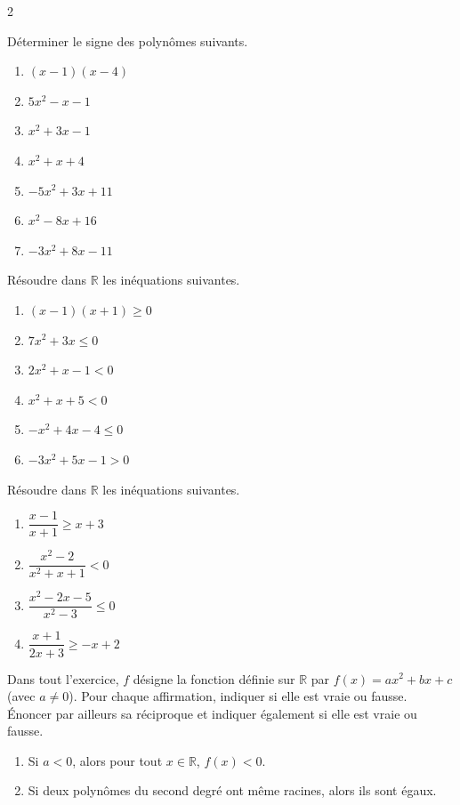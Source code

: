 \documentclass[a4paper,12pt]{article}
\begin{document}
\begin{multicols}{2}
\begin{exercice}[title=Exercice 13 \quad$\star\star$\quad\  {[Calculer]}]{}{}
Déterminer le signe des polynômes suivants.
\begin{enumerate}
    \item \((x - 1)(x - 4)\)
    \item \(5x^2 - x - 1\)
    \item \(x^2 + 3x - 1\)
    \item \(x^2 + x + 4\)
    \item \(-5x^2 + 3x + 11\)
    \item \(x^2 - 8x + 16\)
    \item \(-3x^2 + 8x - 11\)
\end{enumerate}
\end{exercice}

\begin{exercice}[title=Exercice 14 \quad$\star\star$\quad\  {[Calculer]}]{}{}
Résoudre dans \( \mathbb{R} \) les inéquations suivantes.
\begin{enumerate}
    \item \((x - 1)(x + 1) \geq 0\)
    \item \(7x^2 + 3x \leq 0\)
    \item \(2x^2 + x - 1 < 0\)
    \item \(x^2 + x + 5 < 0\)
    \item \(-x^2 + 4x - 4 \leq 0\)
    \item \(-3x^2 + 5x - 1 > 0\)
\end{enumerate}
\end{exercice}

\begin{exercice}[title=Exercice 15 \quad$\star\star\star$\quad\  {[Calculer]}]{}{}
Résoudre dans \( \mathbb{R} \) les inéquations suivantes.
\begin{enumerate}
    \item \(\dfrac{x - 1}{x + 1} \geq x + 3\)
    \item \(\dfrac{x^2 - 2}{x^2+x+1} < 0\)
    \item \(\dfrac{x^2 -2x -5}{x^2 - 3} \leq 0\)
    \item \(\dfrac{x + 1}{2x + 3} \geq -x + 2\)
\end{enumerate}
\end{exercice}

\begin{exercice}[title=Exercice 16 \quad$\star$\quad\  {[Raisonner]}]{}{}
Dans tout l’exercice, \(f\) désigne la fonction définie sur \( \mathbb{R} \) par \( f(x) = ax^2 + bx + c \) (avec \( a \neq 0 \)). Pour chaque affirmation, indiquer si elle est vraie ou fausse. Énoncer par ailleurs sa réciproque et indiquer également si elle est vraie ou fausse.
\begin{enumerate}
    \item Si \(a < 0\), alors pour tout \( x \in \mathbb{R} \), \(f(x) < 0\).
    \item Si deux polynômes du second degré ont même racines, alors ils sont égaux.
\end{enumerate}
\end{exercice}


\end{multicols}
\end{document}
